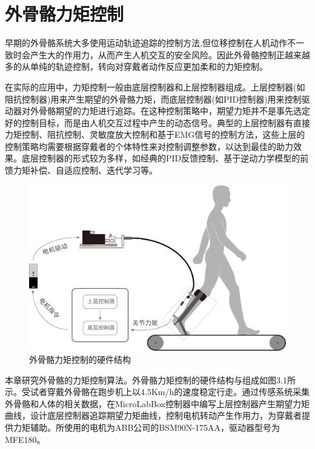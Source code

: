\chapter{外骨骼力矩控制}

早期的外骨骼系统大多使用运动轨迹追踪的控制方法,但位移控制在人机动作不一致时会产生大的作用力，从而产生人机交互的安全风险。因此外骨骼控制正越来越多的从单纯的轨迹控制，转向对穿戴者动作反应更加柔和的力矩控制。

在实际的应用中，力矩控制一般由底层控制器和上层控制器组成。上层控制器(如阻抗控制器)用来产生期望的外骨骼力矩，而底层控制器(如PID控制器)用来控制驱动器对外骨骼期望的力矩进行追踪。在这种控制策略中，期望力矩并不是事先选定好的控制目标，而是由人机交互过程中产生的动态信号。典型的上层控制器有直接力矩控制\cite{p32,p33}、阻抗控制\cite{p34}、灵敏度放大控制\cite{p35}和基于EMG信号的控制方法\cite{p36}，这些上层的控制策略均需要根据穿戴者的个体特性来对控制调整参数，以达到最佳的助力效果。底层控制器的形式较为多样，如经典的PID反馈控制\cite{p27,p28}、基于逆动力学模型的前馈力矩补偿\cite{p7,p22,p29}、自适应控制\cite{p30}、迭代学习\cite{p31}等。

\begin{figure}[!htb]
    \includegraphics[width=14cm]{fig/f48.png}
    \caption{外骨骼力矩控制的硬件结构}
    \label{fig:mark}
\end{figure}

本章研究外骨骼的力矩控制算法。外骨骼力矩控制的硬件结构与组成如图3.1所示。受试者穿戴外骨骼在跑步机上以4.5Km/h的速度稳定行走。通过传感系统采集外骨骼和人体的相关数据，在MicroLabBox控制器中编写上层控制器产生期望力矩曲线，设计底层控制器追踪期望力矩曲线，控制电机转动产生作用力，为穿戴者提供力矩辅助。所使用的电机为ABB公司的BSM90N-175AA，驱动器型号为MFE180。

